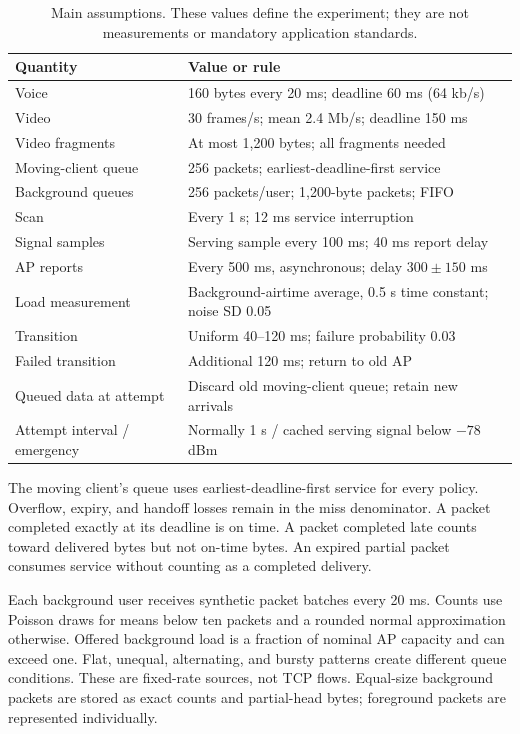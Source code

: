 \documentclass[11pt,a4paper]{article}
\begin{document}
\begin{table}[htbp]\centering\small
\caption{Main assumptions. These values define the experiment; they are not measurements or mandatory application standards.}\label{tab:settings}
\begin{tabularx}{\linewidth}{@{}lX@{}}\toprule
Quantity & Value or rule \\ \midrule
Voice & 160 bytes every 20 ms; deadline 60 ms (64 kb/s)\\
Video & 30 frames/s; mean 2.4 Mb/s; deadline 150 ms\\
Video fragments & At most 1,200 bytes; all fragments needed\\
Moving-client queue & 256 packets; earliest-deadline-first service\\
Background queues & 256 packets/user; 1,200-byte packets; FIFO\\
Scan & Every 1 s; 12 ms service interruption\\
Signal samples & Serving sample every 100 ms; 40 ms report delay\\
AP reports & Every 500 ms, asynchronous; delay $300\pm150$ ms\\
Load measurement & Background-airtime average, 0.5 s time constant; noise SD 0.05\\
Transition & Uniform 40--120 ms; failure probability 0.03\\
Failed transition & Additional 120 ms; return to old AP\\
Queued data at attempt & Discard old moving-client queue; retain new arrivals\\
Attempt interval / emergency & Normally 1 s / cached serving signal below $-78$ dBm\\\bottomrule
\end{tabularx}
\end{table}

The moving client's queue uses earliest-deadline-first service for every policy. Overflow, expiry, and handoff losses remain in the miss denominator. A packet completed exactly at its deadline is on time. A packet completed late counts toward delivered bytes but not on-time bytes. An expired partial packet consumes service without counting as a completed delivery.

Each background user receives synthetic packet batches every 20 ms. Counts use Poisson draws for means below ten packets and a rounded normal approximation otherwise. Offered background load is a fraction of nominal AP capacity and can exceed one. Flat, unequal, alternating, and bursty patterns create different queue conditions. These are fixed-rate sources, not TCP flows. Equal-size background packets are stored as exact counts and partial-head bytes; foreground packets are represented individually.
\end{document}
